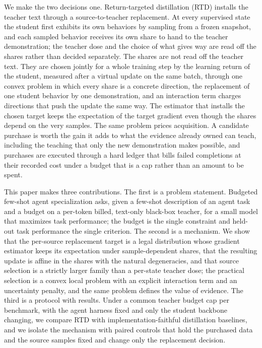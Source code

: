 We make the two decisions one. Return-targeted distillation (RTD)
installs the teacher text through a source-to-teacher replacement. At
every supervised state the student first exhibits its own behaviors
by sampling from a frozen snapshot, and each sampled behavior receives
its own share to hand to the teacher demonstration; the teacher dose
and the choice of what gives way are read off the shares rather than
decided separately. The shares are not read off the teacher text. They
are chosen jointly for a whole training step by the learning return
of the student, measured after a virtual update on the same batch,
through one convex problem in which every share is a concrete
direction, the replacement of one student behavior by one
demonstration, and an interaction term charges directions that push
the update the same way. The estimator that installs the chosen
target keeps the expectation of the target gradient even though the
shares depend on the very samples. The same problem prices
acquisition. A candidate purchase is worth the gain it adds to what
the evidence already owned can teach, including the teaching that
only the new demonstration makes possible, and purchases are executed
through a hard ledger that bills failed completions at their recorded
cost under a budget that is a cap rather than an amount to be spent.

This paper makes three contributions. The first is a problem
statement. Budgeted few-shot agent specialization asks, given a
few-shot description of an agent task and a budget on a per-token
billed, text-only black-box teacher, for a small model that maximizes
task performance; the budget is the single constraint and held-out
task performance the single criterion. The second is a mechanism. We
show that the per-source replacement target is a legal distribution
whose gradient estimator keeps its expectation under sample-dependent
shares, that the resulting update is affine in the shares with the
natural degeneracies, and that source selection is a strictly larger
family than a per-state teacher dose; the practical selection is a
convex local problem with an explicit interaction term and an
uncertainty penalty, and the same problem defines the value of
evidence. The
third is a protocol with results. Under a common teacher budget cap per
benchmark, with the agent harness fixed and only the student backbone
changing, we compare RTD with implementation-faithful distillation
baselines, and we isolate the mechanism with paired controls that hold
the purchased data and the source samples fixed and change only the
replacement decision. 
